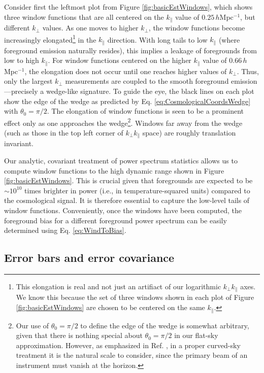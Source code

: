 \documentclass[twocolumn,aps,prd,nofootinbib,showpacs]{revtex4-1}
\begin{document}
Consider first the leftmost plot from Figure \ref{fig:basicEstWindows}, which shows three window functions that are all centered on the $k_\parallel$ value of $0.25\,h$Mpc$^{-1}$, but different $k_\perp$ values.  As one moves to higher $k_\perp$, the window functions become increasingly elongated\footnote{This elongation is real and not just an artifiact of our logarithmic $k_\perp k_\parallel$ axes.  We know this because the set of three windows shown in each plot of Figure \ref{fig:basicEstWindows} are chosen to be centered on the same $k_\parallel$.} in the $k_\parallel$ direction.  With long tails to low $k_\parallel$ (where foreground emission naturally resides), this implies a leakage of foregrounds from low to high $k_\parallel$.  For window functions centered on the higher $k_\parallel$ value of $0.66\,h$Mpc$^{-1}$, the elongation does not occur until one reaches higher values of $k_\perp$.  Thus, only the largest $k_\perp$ measurements are coupled to the smooth foreground emission---precisely a wedge-like signature.  To guide the eye, the black lines  on each plot show the edge of the wedge as predicted by  Eq. \eqref{eq:CosmologicalCoordsWedge} with $\theta_0 = \pi / 2$.  The elongation of window functions is seen to be a prominent effect only as one approaches the wedge\footnote{Our use of $\theta_0 = \pi/2$ to define the edge of the wedge is somewhat arbitrary, given that there is nothing special about $\theta_0 = \pi / 2$ in our flat-sky approximation.  However, as emphasized in Ref. \cite{Parsons2012b}, in a proper curved-sky treatment it is the natural scale to consider, since the primary beam of an instrument must vanish at the horizon.}.  Windows far away from the wedge (such as those in the top left corner of $k_\perp k_\parallel$ space) are roughly translation invariant.  

Our analytic, covariant treatment of power spectrum statistics allows us to compute window functions to the high dynamic range shown in Figure \ref{fig:basicEstWindows}.  This is crucial given that foregrounds are expected to be $\sim 10^{10}$ times brighter in power (i.e., in temperature-squared units) compared to the cosmological signal.  It is therefore essential to capture the low-level tails of window functions.  Conveniently, once the windows have been computed, the foreground bias for a different foreground power spectrum can be easily determined using  Eq. \eqref{eq:WindToBias}.

\subsection{Error bars and error covariance}
\end{document}
